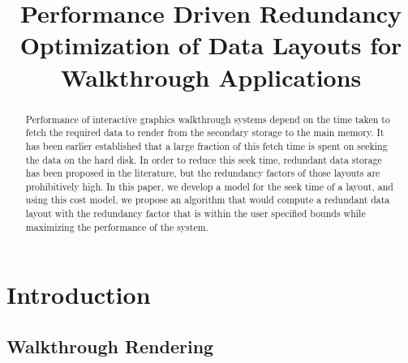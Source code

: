 \documentclass[conference]{acmsiggraph}
\title{Performance Driven Redundancy Optimization of Data Layouts for Walkthrough Applications}
\author{}
\begin{document}

\maketitle

\begin{abstract}

Performance of interactive graphics walkthrough systems depend on the time taken to fetch the required data to render from the secondary storage to the main memory. It has been earlier established that a large fraction of this fetch time is spent on seeking the data on the hard disk. In order to reduce this seek time, redundant data storage has been proposed in the literature, but the redundancy factors of those layouts are prohibitively high.  In this paper, we develop a model for the seek time of a layout, and using this cost model, we propose an algorithm that would compute a redundant data layout with the redundancy factor that is within the user specified bounds while maximizing the performance of the system.



\end{abstract}


\keywordlist


\TOGlinkslist


\copyrightspace

\section{Introduction}

\subsection{Walkthrough Rendering}
\end{document}
